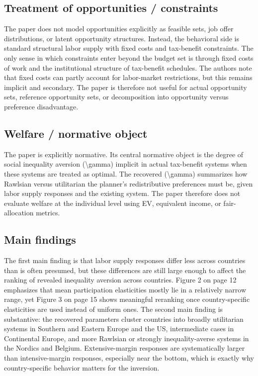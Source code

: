 \documentclass[11pt,a4paper]{article}
\begin{document}
\subsection*{Treatment of opportunities / constraints}
The paper does not model opportunities explicitly as feasible sets, job offer distributions, or latent opportunity structures. Instead, the behavioral side is standard structural labor supply with fixed costs and tax-benefit constraints. The only sense in which constraints enter beyond the budget set is through fixed costs of work and the institutional structure of tax-benefit schedules. The authors note that fixed costs can partly account for labor-market restrictions, but this remains implicit and secondary. The paper is therefore not useful for actual opportunity sets, reference opportunity sets, or decomposition into opportunity versus preference disadvantage.

\subsection*{Welfare / normative object}
The paper is explicitly normative. Its central normative object is the degree of social inequality aversion (\textbackslash{}gamma) implicit in actual tax-benefit systems when these systems are treated as optimal. The recovered (\textbackslash{}gamma) summarizes how Rawlsian versus utilitarian the planner’s redistributive preferences must be, given labor supply responses and the existing system. The paper therefore does not evaluate welfare at the individual level using EV, equivalent income, or fair-allocation metrics.

\subsection*{Main findings}
The first main finding is that labor supply responses differ less across countries than is often presumed, but these differences are still large enough to affect the ranking of revealed inequality aversion across countries. Figure 2 on page 12 emphasizes that mean participation elasticities mostly lie in a relatively narrow range, yet Figure 3 on page 15 shows meaningful reranking once country-specific elasticities are used instead of uniform ones. The second main finding is substantive: the recovered parameters cluster countries into broadly utilitarian systems in Southern and Eastern Europe and the US, intermediate cases in Continental Europe, and more Rawlsian or strongly inequality-averse systems in the Nordics and Belgium. Extensive-margin responses are systematically larger than intensive-margin responses, especially near the bottom, which is exactly why country-specific behavior matters for the inversion.
\end{document}
